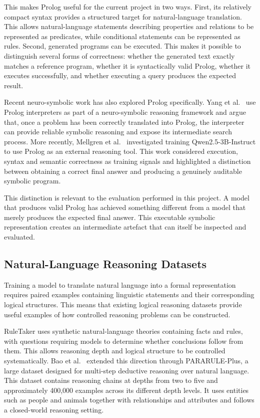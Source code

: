 \documentclass[11pt]{article} %
\theoremstyle{plain}
\theoremstyle{definition}
\begin{document}
This makes Prolog useful for the current project in two ways. First, its
relatively compact syntax provides a structured target for natural-language
translation. This allows natural-language statements describing properties and
relations to be represented as predicates, while conditional statements can be
represented as rules. Second, generated programs can be executed. This makes
it possible to distinguish several forms of correctness: whether the generated
text exactly matches a reference program, whether it is syntactically valid
Prolog, whether it executes successfully, and whether executing a query
produces the expected result.

Recent neuro-symbolic work has also explored Prolog specifically. Yang et
al.~\cite{yang2025neurosymbolic} use Prolog interpreters as part of a
neuro-symbolic reasoning framework and argue that, once a problem has been
correctly translated into Prolog, the interpreter can provide reliable symbolic
reasoning and expose its intermediate search process. More recently, Mellgren
et al.~\cite{mellgren2026prolog} investigated training Qwen2.5-3B-Instruct to
use Prolog as an external reasoning tool. This work
considered execution, syntax and semantic correctness as training signals and
highlighted a distinction between obtaining a correct final answer and
producing a genuinely auditable symbolic program.

This distinction is relevant to the evaluation performed in this project. A
model that produces valid Prolog has achieved something different from a model
that merely produces the expected final answer. This executable symbolic
representation creates an intermediate artefact that can itself be inspected
and evaluated.


\subsection{Natural-Language Reasoning Datasets}

Training a model to translate natural language into a formal representation
requires paired examples containing linguistic statements and their
corresponding logical structures. This means that existing logical reasoning
datasets provide useful examples of how controlled reasoning problems can be
constructed.

RuleTaker uses synthetic natural-language theories containing facts and rules,
with questions requiring models to determine whether conclusions follow from
them. This allows reasoning depth and logical structure to be controlled
systematically. Bao et al.~\cite{bao2022pararule} extended this direction through
PARARULE-Plus, a large dataset designed for multi-step deductive reasoning over
natural language. This dataset contains reasoning chains at depths from two to
five and approximately 400,000 examples across its different depth levels. It
uses entities such as people and animals together with relationships and
attributes and follows a closed-world reasoning setting.
\end{document}
